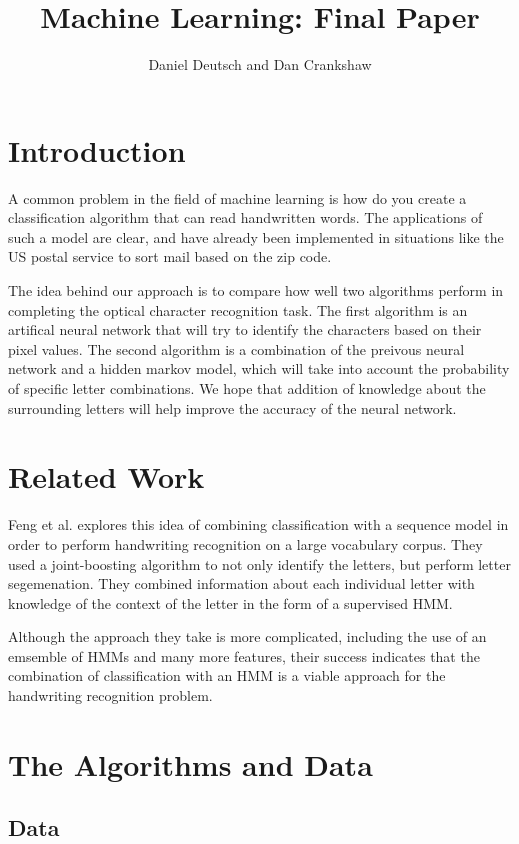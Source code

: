 \documentclass[11pt,a4paper,twocolumn]{article}
\author{Daniel Deutsch and Dan Crankshaw}
\title{Machine Learning: Final Paper}
\date{}
\begin{document}
\maketitle

\section{Introduction}

A common problem in the field of machine learning is how do you create a classification algorithm that can read handwritten words. The applications of such a model are clear, and have already been implemented in situations like the US postal service to sort mail based on the zip code. 

The idea behind our approach is to compare how well two algorithms perform in completing the optical character recognition task. The first algorithm is an artifical neural network that will try to identify the characters based on their pixel values. The second algorithm is a combination of the preivous neural network and a hidden markov model, which will take into account the probability of specific letter combinations. We hope that addition of knowledge about the surrounding letters will help improve the accuracy of the neural network.

\section{Related Work}

Feng et al.\cite{feng2008hidden} explores this idea of combining classification with a sequence model in order to perform handwriting recognition on a large vocabulary corpus. They used a joint-boosting algorithm to not only identify the letters, but perform letter segemenation. They combined information about each individual letter with knowledge of the context of the letter in the form of a supervised HMM.

Although the approach they take is more complicated, including the use of an emsemble of HMMs and many more features, their success indicates that the combination of classification with an HMM is a viable approach for the handwriting recognition problem.



\section{The Algorithms and Data}

\subsection*{Data}
\end{document}
